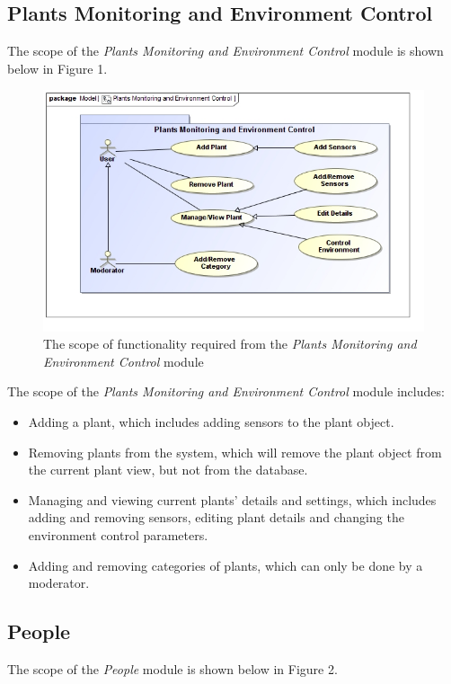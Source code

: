 \documentclass{article}
\begin{document}
	\subsection{Plants Monitoring and Environment Control}
		The scope of the \emph{Plants Monitoring and Environment Control} module is shown below in Figure 1.
		
		\begin{figure}[H]
			\centering
			\includegraphics[width=\textwidth]{../software-architecture-specification/Plants_Monitoring_and_Environment_Control.jpg}
			\caption{The scope of functionality required from the \emph{Plants Monitoring and Environment Control} module}
		\end{figure}
		
		The scope of the \emph{Plants Monitoring and Environment Control} module includes:
		
		\begin{itemize}
			\item Adding a plant, which includes adding sensors to the plant object.
			\item Removing plants from the system, which will remove the plant object from the current plant view, but not from the database.
			\item Managing and viewing current plants' details and settings, which includes adding and removing sensors, editing plant details and changing the environment control parameters.
			\item Adding and removing categories of plants, which can only be done by a moderator.
		\end{itemize}
		
	\pagebreak
	\subsection{People}
		The scope of the \emph{People} module is shown below in Figure 2.
		
\end{document}
